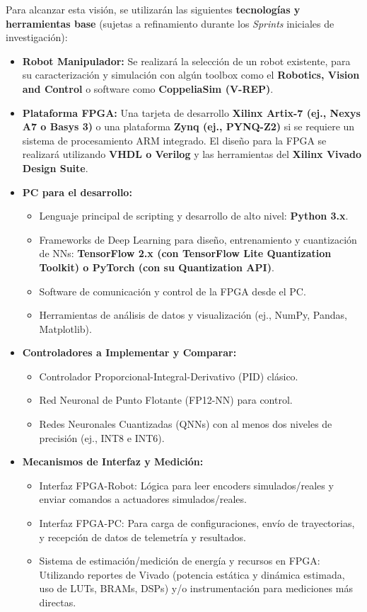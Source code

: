 \documentclass[12pt]{article}
\begin{document}
Para alcanzar esta visión, se utilizarán las siguientes \textbf{tecnologías y herramientas base} (sujetas a refinamiento durante los \textit{Sprints} iniciales de investigación):
\begin{itemize}
    \item \textbf{Robot Manipulador:} Se realizará la selección de un robot existente, para su caracterización y simulación con algún toolbox como el \textbf{Robotics, Vision and Control} o software como \textbf{CoppeliaSim (V-REP)}.
    \item \textbf{Plataforma FPGA:} Una tarjeta de desarrollo \textbf{Xilinx Artix-7 (ej., Nexys A7 o Basys 3)} o una plataforma \textbf{Zynq (ej., PYNQ-Z2)} si se requiere un sistema de procesamiento ARM integrado. El diseño para la FPGA se realizará utilizando \textbf{VHDL o Verilog} y las herramientas del \textbf{Xilinx Vivado Design Suite}.
    \item \textbf{PC para el desarrollo:}
        \begin{itemize}
            \item Lenguaje principal de scripting y desarrollo de alto nivel: \textbf{Python 3.x}.
            \item Frameworks de Deep Learning para diseño, entrenamiento y cuantización de NNs: \textbf{TensorFlow 2.x (con TensorFlow Lite Quantization Toolkit) o PyTorch (con su Quantization API)}.
            \item Software de comunicación y control de la FPGA desde el PC.
            \item Herramientas de análisis de datos y visualización (ej., NumPy, Pandas, Matplotlib).
        \end{itemize}
    \item \textbf{Controladores a Implementar y Comparar:}
        \begin{itemize}
            \item Controlador Proporcional-Integral-Derivativo (PID) clásico.
            \item Red Neuronal de Punto Flotante (FP12-NN) para control.
            \item Redes Neuronales Cuantizadas (QNNs) con al menos dos niveles de precisión (ej., INT8 e INT6).
        \end{itemize}
    \item \textbf{Mecanismos de Interfaz y Medición:}
        \begin{itemize}
            \item Interfaz FPGA-Robot: Lógica para leer encoders simulados/reales y enviar comandos a actuadores simulados/reales.
            \item Interfaz FPGA-PC: Para carga de configuraciones, envío de trayectorias, y recepción de datos de telemetría y resultados.
            \item Sistema de estimación/medición de energía y recursos en FPGA: Utilizando reportes de Vivado (potencia estática y dinámica estimada, uso de LUTs, BRAMs, DSPs) y/o instrumentación para mediciones más directas.
        \end{itemize}
\end{itemize}
\end{document}
